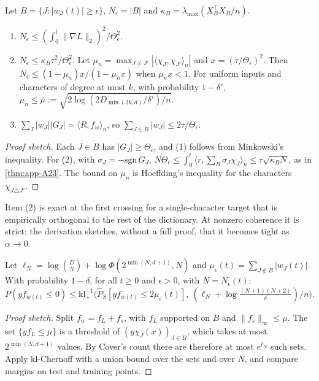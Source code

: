 \begin{theorem}\label{thm:app-C23}
\quad Let $B=\{J:|w_J(t)|\ge\epsilon\}$, $N_\epsilon=|B|$ and $\kappa_B=\lambda_{\max}(X_B^\top X_B/n)$.
\begin{enumerate}[label=(\arabic*),nosep]
\item $N_\epsilon\le(\int_0^t\|\nabla L\|_2)^2/\Theta_\epsilon^2$.
\item $N_\epsilon\le\kappa_B\tau^2/\Theta_\epsilon^2$. Let $\mu_n=\max_{J\ne J'}|\langle\chi_J,\chi_{J'}\rangle_n|$ and $x=(\tau/\Theta_\epsilon)^2$. Then $N_\epsilon\le(1-\mu_n)x/(1-\mu_nx)$ when $\mu_nx<1$. For uniform inputs and characters of degree at most $k$, with probability $1-\delta'$, $\mu_n\le\bar\mu:=\sqrt{2\log(2D_{\min(2k,d)}/\delta')/n}$.
\item $\sum_J|w_J||G_J|=\langle R,f_w\rangle_n$, so $\sum_{J\in B}|w_J|\le2\tau/\Theta_\epsilon$.
\end{enumerate}
\end{theorem}
\begin{proof}[Proof sketch]
Each $J\in B$ has $|G_J|\ge\Theta_\epsilon$, and (1) follows from Minkowski's inequality. For (2), with $\sigma_J=-\mathrm{sgn}\,G_J$, $N\Theta_\epsilon\le\int_0^t\langle r,\sum_B\sigma_J\chi_J\rangle_n\le\tau\sqrt{\kappa_BN}$, as in \cref{thm:app-A23}. The bound on $\mu_n$ is Hoeffding's inequality for the characters $\chi_{J\triangle J'}$.
\end{proof}
Item (2) is exact at the first crossing for a single-character target that is empirically orthogonal to the rest of the dictionary. At nonzero coherence it is strict; the derivation sketches, without a full proof, that it becomes tight as $\alpha\to0$.

\begin{theorem}\label{thm:app-C24}
\quad Let $\ell_N=\log\binom DN+\log\Phi(2^{\min(N,d+1)},N)$ and $\mu_\epsilon(t)=\sum_{J\notin B}|w_J(t)|$. With probability $1-\delta$, for all $t\ge0$ and $\epsilon>0$, with $N=N_\epsilon(t)$:
\[P(yf_{w(t)}\le0)\le\mathrm{kl}^{-1}_+\big(\widehat P_S[yf_{w(t)}\le2\mu_\epsilon(t)],\ (\ell_N+\log\tfrac{(N+1)(N+2)}\delta)/n\big).\]
\end{theorem}
\begin{proof}[Proof sketch]
Split $f_w=f_L+f_s$, with $f_L$ supported on $B$ and $\|f_s\|_\infty\le\mu$. The set $\{yf_L\le\mu\}$ is a threshold of $(y\chi_J(x))_{J\in B}$, which takes at most $2^{\min(N,d+1)}$ values. By Cover's count there are therefore at most $e^{\ell_N}$ such sets. Apply kl-Chernoff with a union bound over the sets and over $N$, and compare margins on test and training points.
\end{proof}

